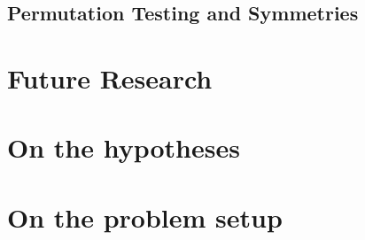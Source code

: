 \documentclass[article,lineno]{biometrika}
\begin{document}
\subsection{Permutation Testing and Symmetries}



\section{Future Research}


\section{On the hypotheses}

\section{On the problem setup}









\end{document}
